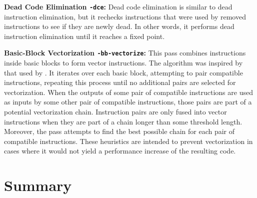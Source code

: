 \noindent\textbf{Dead Code Elimination \texttt{-dce}:}
Dead code elimination is similar to dead instruction elimination, but it rechecks instructions that were used by removed instructions to see if they are newly dead.
In other words, it performs dead instruction elimination until it reaches a fixed point.

\noindent\textbf{Basic-Block Vectorization \texttt{-bb-vectorize}:}
This pass combines instructions inside basic blocks to form vector instructions.
The algorithm was inspired by that used by \cite{franchetti05}.
It iterates over each basic block, attempting to pair compatible instructions, repeating this process until no additional pairs are selected for vectorization.
When the outputs of some pair of compatible instructions are used as inputs by some other pair of compatible instructions, those pairs are part of a potential vectorization chain.
Instruction pairs are only fused into vector instructions when they are part of a chain longer than some threshold length.
Moreover, the pass attempts to find the best possible chain for each pair of compatible instructions.
These heuristics are intended to prevent vectorization in cases where it would not yield a performance increase of the resulting code.




\section{Summary}

